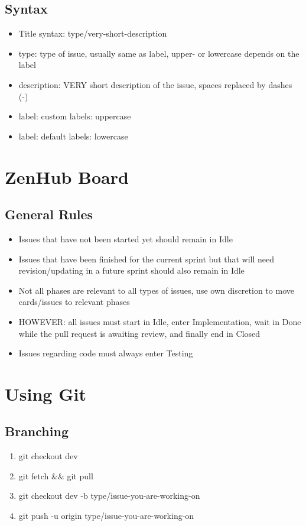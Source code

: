 \documentclass{article}
\begin{document}
		\subsection{Syntax}
			\begin{itemize}
				\item Title syntax: type/very-short-description
				\item type: type of issue, usually same as label, upper- or lowercase depends on the label
				\item description: VERY short description of the issue, spaces replaced by dashes (-)
				\item label: custom labels: uppercase
				\item label: default labels: lowercase
			\end{itemize}

	\section{ZenHub Board}
		\subsection{General Rules}
			\begin{itemize}
				\item Issues that have not been started yet should remain in Idle
				\item Issues that have been finished for the current sprint but that will need revision/updating in a future sprint should also remain in Idle
				\item Not all phases are relevant to all types of issues, use own discretion to move cards/issues to relevant phases
				\item HOWEVER: all issues must start in Idle, enter Implementation, wait in Done while the pull request is awaiting review, and finally end in Closed
				\item Issues regarding code must always enter Testing
			\end{itemize}

	\section{Using Git}
		\subsection{Branching}
			\begin{enumerate}
				\item git checkout dev
				\item git fetch \&\& git pull
				\item git checkout dev -b type/issue-you-are-working-on
				\item git push -u origin type/issue-you-are-working-on
			\end{enumerate}
\end{document}

